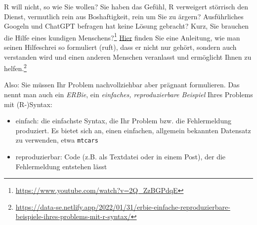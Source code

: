 \documentclass[
  a4paper,
]{scrbook}
\providecommand{\tightlist}{%
  \setlength{\itemsep}{0pt}\setlength{\parskip}{0pt}}\usepackage{longtable,booktabs,array}
\theoremstyle{definition}
\theoremstyle{definition}
\theoremstyle{definition}
\theoremstyle{remark}
\begin{document}
R will nicht, so wie Sie wollen? Sie haben das Gefühl, R verweigert
störrisch den Dienst, vermutlich rein aus Boshaftigkeit, rein um Sie zu
ärgern? Ausführliches Googeln und ChatGPT befragen hat keine Lösung
gebracht? Kurz, Sie brauchen die Hilfe eines kundigen
Menschens?\footnote{\url{https://www.youtube.com/watch?v=2Q_ZzBGPdqE}}
\href{https://data-se.netlify.app/2022/01/31/erbie-einfache-reproduzierbare-beispiele-ihres-problems-mit-r-syntax/}{Hier}
finden Sie eine Anleitung, wie man seinen Hilfeschrei so formuliert
(ruft), dass er nicht nur gehört, sondern auch verstanden wird und einen
anderen Menschen veranlasst und ermöglicht Ihnen zu helfen.\footnote{\url{https://data-se.netlify.app/2022/01/31/erbie-einfache-reproduzierbare-beispiele-ihres-problems-mit-r-syntax/}}

Also: Sie müssen Ihr Problem nachvollziehbar aber prägnant formulieren.
Das nennt man auch ein \emph{ERBie}, ein \emph{einfaches,
reproduzierbare Beispiel} Ihres Problems mit (R-)Syntax:

\begin{itemize}
\tightlist
\item
  einfach: die einfachste Syntax, die Ihr Problem bzw. die Fehlermeldung
  produziert. Es bietet sich an, einen einfachen, allgemein bekannten
  Datensatz zu verwenden, etwa \texttt{mtcars}
\item
  reproduzierbar: Code (z.B. als Textdatei oder in einem Post), der die
  Fehlermeldung entstehen lässt
\end{itemize}
\end{document}
